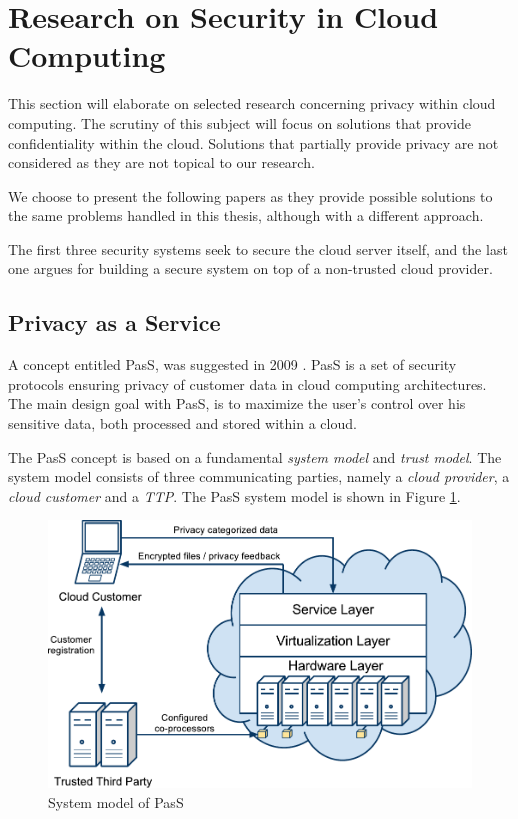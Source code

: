 \documentclass[pdftex,english,10pt,b5paper,twoside]{book}
\begin{document}
\section{Research on Security in Cloud Computing}
\label{sec:research}

This section will elaborate on selected research concerning privacy
within cloud computing. The scrutiny of this subject will focus on
solutions that provide confidentiality within the cloud. Solutions that partially
provide privacy are not considered as they are not topical to our research.

We choose to present the following papers as they provide possible solutions to the
same problems handled in this thesis, although with a different approach.


The first three security systems seek to secure the cloud server
itself, and the last one argues for building a secure system on top of
a non-trusted cloud provider.

\subsection{Privacy as a Service}

A concept entitled \ac{PasS}, was suggested in 2009 \cite{PasS}. \ac{PasS} is a
set of security protocols ensuring privacy of customer data in cloud computing
architectures. The main design goal with \ac{PasS}, is to maximize the user's
control over his sensitive data, both processed and stored within a cloud.

The \ac{PasS} concept is based on a fundamental \emph{system model} and
\emph{trust model}. The system model consists of three communicating parties,
namely a \emph{cloud provider}, a \emph{cloud customer} and a \emph{\ac{TTP}}.
The \ac{PasS} system model is shown in Figure \ref{fig:RW:PasS}.

\begin{figure}[h!]
    \centering
    \includegraphics[scale=0.6]{ArchitecturePasS.pdf}
    \caption{System model of PasS}
    \label{fig:RW:PasS}
\end{figure}
\end{document}
